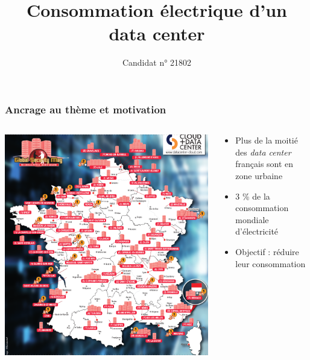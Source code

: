 \documentclass[a4paper,11pt]{beamer}
\title{Consommation électrique d'un data center}
\author{Candidat n° 21802}
\date{}
\begin{document}

\maketitle %


\begin{frame}
    \frametitle{Ancrage au thème et motivation}

    \begin{columns}
        \begin{column}{0.5\textwidth}
            \includegraphics[width=\textwidth]{carte_data_center.png}
        \end{column}
        \begin{column}{0.5\textwidth}
            \begin{itemize}
                \item Plus de la moitié des \textit{data center} français sont en zone urbaine
                \item 3 \% de la consommation mondiale d'électricité
                \item Objectif : réduire leur consommation
            \end{itemize}
        \end{column}
    \end{columns}
\end{frame}
\end{document}
